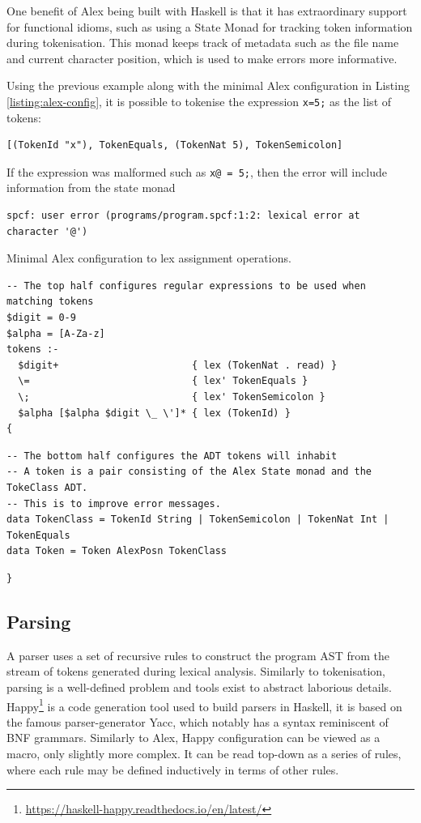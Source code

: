 \documentclass[12pt,a4paper]{report}
\theoremstyle{definition}
\theoremstyle{definition}
\theoremstyle{remark}
\begin{document}
One benefit of Alex being built with Haskell is that it has extraordinary support for functional idioms, such as using a State Monad for tracking token information during tokenisation. This monad keeps track of metadata such as the file name and current character position, which is used to make errors more informative. 

Using the previous example along with the minimal Alex configuration in Listing \ref{listing:alex-config}, it is possible to tokenise the expression \lstinline{x=5;} as the list of tokens:
\begin{verbatim}
[(TokenId "x"), TokenEquals, (TokenNat 5), TokenSemicolon]
\end{verbatim}
If the expression was malformed such as \lstinline{x@ = 5;}, then the error will include information from the state monad
\begin{verbatim}
spcf: user error (programs/program.spcf:1:2: lexical error at character '@')
\end{verbatim}

\begin{listing}
\caption{Minimal Alex configuration to lex assignment operations.}
\begin{verbatim}
-- The top half configures regular expressions to be used when matching tokens
$digit = 0-9
$alpha = [A-Za-z]
tokens :-
  $digit+                       { lex (TokenNat . read) }
  \=                            { lex' TokenEquals }
  \;                            { lex' TokenSemicolon }
  $alpha [$alpha $digit \_ \']* { lex (TokenId) }
{
\end{verbatim}
\label{listing:alex-config}
\begin{verbatim}
-- The bottom half configures the ADT tokens will inhabit
-- A token is a pair consisting of the Alex State monad and the TokeClass ADT.
-- This is to improve error messages.
data TokenClass = TokenId String | TokenSemicolon | TokenNat Int | TokenEquals
data Token = Token AlexPosn TokenClass
\end{verbatim}
\begin{verbatim}
}
\end{verbatim}
\end{listing}

\subsection{Parsing} 
A parser uses a set of recursive rules to construct the program AST from the stream of tokens generated during lexical analysis. Similarly to tokenisation, parsing is a well-defined problem and tools exist to abstract laborious details. Happy\footnote{\url{https://haskell-happy.readthedocs.io/en/latest/}} is a code generation tool used to build parsers in Haskell, it is based on the famous parser-generator Yacc, which notably has a syntax reminiscent of BNF grammars. Similarly to Alex, Happy configuration can be viewed as a macro, only slightly more complex. It can be read top-down as a series of rules, where each rule may be defined inductively in terms of other rules. 
\end{document}
